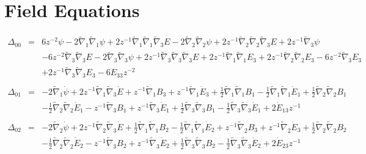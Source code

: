 \documentclass[10pt,letterpaper]{article}
\numberwithin{equation}{section}
\begin{document}
\section{Field Equations}
%
%
\begin{eqnarray}
\Delta_{00}&=& 6 z^{-2} \psi - 2 \tilde{\nabla}_{1}\tilde{\nabla}_{1}\psi + 2 z^{-1} \tilde{\nabla}_{1}\tilde{\nabla}_{1}\tilde{\nabla}_{3}E - 2 \tilde{\nabla}_{2}\tilde{\nabla}_{2}\psi + 2 z^{-1} \tilde{\nabla}_{2}\tilde{\nabla}_{2}\tilde{\nabla}_{3}E + 2 z^{-1} \tilde{\nabla}_{3}\psi \nonumber \\ 
&& - 6 z^{-2} \tilde{\nabla}_{3}\tilde{\nabla}_{3}E - 2 \tilde{\nabla}_{3}\tilde{\nabla}_{3}\psi + 2 z^{-1} \tilde{\nabla}_{3}\tilde{\nabla}_{3}\tilde{\nabla}_{3}E+2 z^{-1} \tilde{\nabla}_{1}\tilde{\nabla}_{1}E_{3} + 2 z^{-1} \tilde{\nabla}_{2}\tilde{\nabla}_{2}E_{3} - 6 z^{-2} \tilde{\nabla}_{3}E_{3} \nonumber \\ 
&& + 2 z^{-1} \tilde{\nabla}_{3}\tilde{\nabla}_{3}E_{3}-6 E_{33} z^{-2}
\\  \nonumber\\ 
\Delta_{01}&=& -2 \tilde{\nabla}_{1}\dot{\psi} + 2 z^{-1} \tilde{\nabla}_{1}\tilde{\nabla}_{3}\dot{E}+z^{-1} \tilde{\nabla}_{1}B_{3} + z^{-1} \tilde{\nabla}_{1}\dot{E}_{3} + \tfrac{1}{2} \tilde{\nabla}_{1}\tilde{\nabla}_{1}B_{1} -  \tfrac{1}{2} \tilde{\nabla}_{1}\tilde{\nabla}_{1}\dot{E}_{1} + \tfrac{1}{2} \tilde{\nabla}_{2}\tilde{\nabla}_{2}B_{1} \nonumber \\ 
&& -  \tfrac{1}{2} \tilde{\nabla}_{2}\tilde{\nabla}_{2}\dot{E}_{1} -  z^{-1} \tilde{\nabla}_{3}B_{1} + z^{-1} \tilde{\nabla}_{3}\dot{E}_{1} + \tfrac{1}{2} \tilde{\nabla}_{3}\tilde{\nabla}_{3}B_{1} -  \tfrac{1}{2} \tilde{\nabla}_{3}\tilde{\nabla}_{3}\dot{E}_{1}+2 \dot{E}_{13} z^{-1}
\\  \nonumber\\ 
\Delta_{02}&=& -2 \tilde{\nabla}_{2}\dot{\psi} + 2 z^{-1} \tilde{\nabla}_{2}\tilde{\nabla}_{3}\dot{E}+\tfrac{1}{2} \tilde{\nabla}_{1}\tilde{\nabla}_{1}B_{2} -  \tfrac{1}{2} \tilde{\nabla}_{1}\tilde{\nabla}_{1}\dot{E}_{2} + z^{-1} \tilde{\nabla}_{2}B_{3} + z^{-1} \tilde{\nabla}_{2}\dot{E}_{3} + \tfrac{1}{2} \tilde{\nabla}_{2}\tilde{\nabla}_{2}B_{2} \nonumber \\ 
&& -  \tfrac{1}{2} \tilde{\nabla}_{2}\tilde{\nabla}_{2}\dot{E}_{2} -  z^{-1} \tilde{\nabla}_{3}B_{2} + z^{-1} \tilde{\nabla}_{3}\dot{E}_{2} + \tfrac{1}{2} \tilde{\nabla}_{3}\tilde{\nabla}_{3}B_{2} -  \tfrac{1}{2} \tilde{\nabla}_{3}\tilde{\nabla}_{3}\dot{E}_{2}+2 \dot{E}_{23} z^{-1}

\end{eqnarray}
\end{document}
